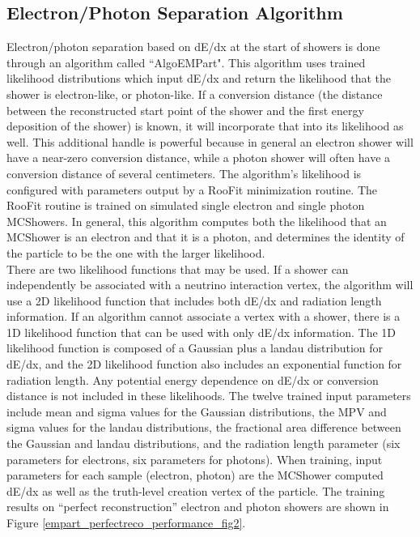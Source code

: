 \subsection{Electron/Photon Separation Algorithm}\label{algoempart_section}
Electron/photon separation based on dE/dx at the start of showers is done through an algorithm called ``AlgoEMPart". This algorithm uses trained likelihood distributions which input dE/dx and return the likelihood that the shower is electron-like, or photon-like. If a conversion distance (the distance between the reconstructed start point of the shower and the first energy deposition of the shower) is known, it will incorporate that into its likelihood as well. This additional handle is powerful because in general an electron shower will have a near-zero conversion distance, while a photon shower will often have a conversion distance of several centimeters. The algorithm's likelihood is configured with parameters output by a RooFit \cite{ROOFITsource} minimization routine. The RooFit routine is trained on simulated single electron and single photon {\sc MCShowers}. In general, this algorithm computes both the likelihood that an {\sc MCShower} is an electron and that it is a photon, and determines the identity of the particle to be the one with the larger likelihood.\\

There are two likelihood functions that may be used. If a shower can independently be associated with a neutrino interaction vertex, the algorithm will use a 2D likelihood function that includes both dE/dx and radiation length information. If an algorithm cannot associate a vertex with a shower, there is a 1D likelihood function that can be used with only dE/dx information. The 1D likelihood function is composed of a Gaussian plus a landau distribution for dE/dx, and the 2D likelihood function also includes an exponential function for radiation length. Any potential energy dependence on dE/dx or conversion distance is not included in these likelihoods. The twelve trained input parameters include mean and sigma values for the Gaussian distributions, the MPV and sigma values for the landau distributions, the fractional area difference between the Gaussian and landau distributions, and the radiation length parameter (six parameters for electrons, six parameters for photons). When training, input parameters for each sample (electron, photon) are the {\sc MCShower} computed dE/dx as well as the truth-level creation vertex of the particle. The training results on ``perfect reconstruction'' electron and photon showers are shown in Figure \ref{empart_perfectreco_performance_fig2}.%

